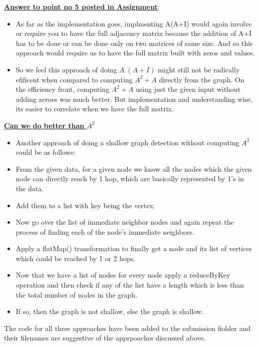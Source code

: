 \documentclass[11pt]{article}
\begin{document}
\begin{itemize}
\textbf{\underline{Answer to point no 5 posted in Assignment}}:

\begin{itemize}
     \item  As far as the implementation goes, implmenting A(A+I) would again involve or require you to have the full adjacency matrix because the addition of A+I has to be done or can be done only on two matrices of same size. And so this approach would require us to have the full matrix built with zeros and values.
     
     \item So we feel this approach of doing $A.(A+I)$ might still not be radically efificent when compared to computing $A^2+A$ directly from the graph. On the efficiency front, computing $A^2 + A$ using just the given input without adding zeroes was much better. But implementation and understanding wise, its easier to correlate when we have the full matrix.
     
     
\end{itemize}


\textbf{\underline{Can we do better than $A^2$}}

\begin{itemize}
	\item Another approach of doing a shallow graph detection without computing $A^2$ could be as follows:
	\item From the given data, for a given node we know all the nodes which the given node can directly reach by 1 hop, which are basically represented by 1's in the data. 
	\item Add them to a list with key being the vertex.
	\item Now go over the list of immediate neighbor nodes and again repeat the process of finding each of the node's immediate neighbors. 
	\item Apply a flatMap() transformation to finally get a node and its list of vertices which could be reached by 1 or 2 hops.
	\item Now that we have a list of nodes for every node apply a reduceByKey operation and then check if any of the list have a  length which is less than the total number of nodes in the graph.
	\item If so, then the graph is not shallow, else the graph is shallow.
\end{itemize} 

The code for all three approaches have been added to the submission fiolder and their filenames are suggestive of the apprpoaches discussed above.

\end{itemize}
\end{document}
